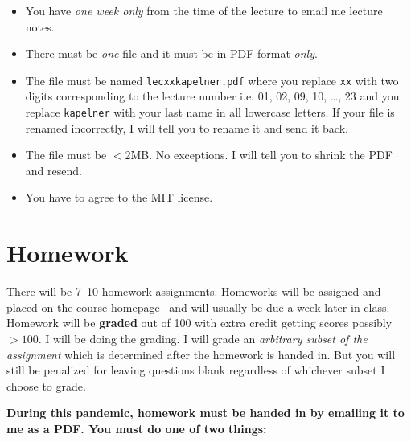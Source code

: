 \documentclass[12pt]{article}
\newcommand{\coursewebpage}{\href{https://github.com/kapelner/QC_Math_369_Fall_2020}{course homepage}}
\begin{document}
\begin{itemize}
\item You have \emph{one week only} from the time of the lecture to email me lecture notes.
\item There must be \emph{one} file and it must be in PDF format \textit{only}.
\item The file must be named \texttt{lecxxkapelner.pdf} where you replace \texttt{xx} with two digits corresponding to the lecture number i.e. 01, 02, 09, 10, \ldots, 23 and you replace \texttt{kapelner} with your last name in all lowercase letters. If your file is renamed incorrectly, I will tell you to rename it and send it back.
\item The file must be $<$2MB. No exceptions. I will tell you to shrink the PDF and resend.
\item You have to agree to the MIT license.
\end{itemize}

\section*{Homework}

There will be 7--10 homework assignments. Homeworks will be assigned and placed on the \coursewebpage~ and will usually be due a week later in class. Homework will be \textbf{graded} out of 100 with extra credit getting scores possibly $> 100$. I will be doing the grading. I will grade an \textit{arbitrary subset of the assignment} which is determined after the homework is handed in. But you will still be penalized for leaving questions blank regardless of whichever subset I choose to grade. 

%

\textbf{During this pandemic, homework must be handed in by emailing it to me as a PDF. You must do one of two things:}
\end{document}
